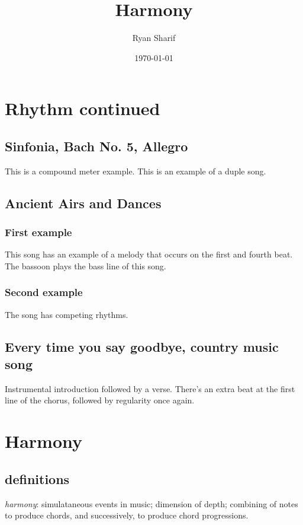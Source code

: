 \documentclass[letter,twoside,twocolumn]{article}
\author{Ryan Sharif}
\date{\today}
\title{Harmony}
\begin{document}
\maketitle

\section{Rhythm continued}
\label{sec-1}
\subsection{Sinfonia, Bach No. 5, Allegro}
\label{sec-1-1}
This is a compound meter example. This is an example of a duple song.

\subsection{Ancient Airs and Dances}
\label{sec-1-2}

\subsubsection{First example}
\label{sec-1-2-1}
This song has an example of a melody that occurs on the first and fourth
beat. The bassoon plays the bass line of this song. 
\subsubsection{Second example}
\label{sec-1-2-2}
The song has competing rhythms.

\subsection{Every time you say goodbye, country music song}
\label{sec-1-3}
Instrumental introduction followed by a verse. There's
an extra beat at the first line of the chorus, followed
by regularity once again.

\section{Harmony}
\label{sec-2}
\subsection{definitions}
\label{sec-2-1}
\emph{harmony}: simulataneous events in music; dimension of depth; combining
of notes to produce chords, and successively, to produce chord progressions. \\
\end{document}
